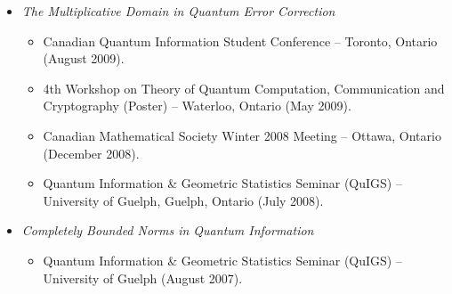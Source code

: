 \documentclass[letterpaper,11pt]{article}
\begin{document}
\begin{itemize}
\item
	{\it The Multiplicative Domain in Quantum Error Correction}
	\begin{itemize}
		\item Canadian Quantum Information Student Conference -- Toronto, Ontario (August 2009).
		\item 4th Workshop on Theory of Quantum Computation, Communication and Cryptography (Poster) -- Waterloo, Ontario (May 2009).
		\item Canadian Mathematical Society Winter 2008 Meeting -- Ottawa, Ontario (December 2008).
		\item Quantum Information \& Geometric Statistics Seminar (QuIGS) -- University of Guelph, Guelph, Ontario (July 2008).
	\end{itemize}

\item
	{\it Completely Bounded Norms in Quantum Information}
	\begin{itemize}
		\item Quantum Information \& Geometric Statistics Seminar (QuIGS) -- University of Guelph (August 2007).
	\end{itemize}
\end{itemize}
\end{document}
